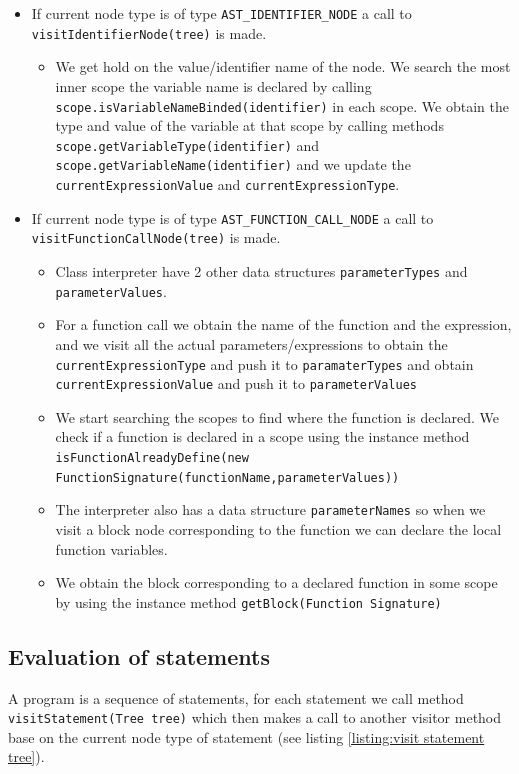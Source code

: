 \begin{itemize}
            \item If current node type is of type \verb!AST_IDENTIFIER_NODE! a call to \verb!visitIdentifierNode(tree)! is made.
           \begin{itemize}
               \item We get hold on the value/identifier name of the node. We search  the most inner scope the variable name is declared by calling \verb!scope.isVariableNameBinded(identifier)! in each scope. We obtain the type  and value of the variable at that scope by calling methods \verb!scope.getVariableType(identifier)! and \verb!scope.getVariableName(identifier)! and we update the \verb!currentExpressionValue! and \verb!currentExpressionType!.
           \end{itemize}
           \item If current node type is of type \verb!AST_FUNCTION_CALL_NODE! a call to \verb!visitFunctionCallNode(tree)! is made.
           \begin{itemize}
                \item Class interpreter have 2 other data structures \verb!parameterTypes! and \verb!parameterValues!.
               \item For a function call we obtain the name of the function and the expression, and we visit all the actual parameters/expressions to obtain the \verb!currentExpressionType! and push it to \verb!paramaterTypes! and obtain \verb!currentExpressionValue! and push it to \verb!parameterValues! 
               \item We start searching the scopes to find where the function is declared. We check if a function is declared in a scope using the instance method \verb!isFunctionAlreadyDefine(new FunctionSignature(functionName,parameterValues))!
              \item  The interpreter also has a data structure \verb!parameterNames! so when we visit a block node corresponding to the function we can declare the local function variables.
              \item We obtain the block corresponding to a declared function in some scope by using the instance method \verb!getBlock(Function Signature)!
           \end{itemize}
         
\end{itemize}

\subsection{Evaluation of statements}
A program is a sequence of statements, for each statement we call method \verb!visitStatement(Tree tree)! which
then makes a call to another visitor method base on the current node
type of statement (see listing \ref{listing:visit statement tree}).


